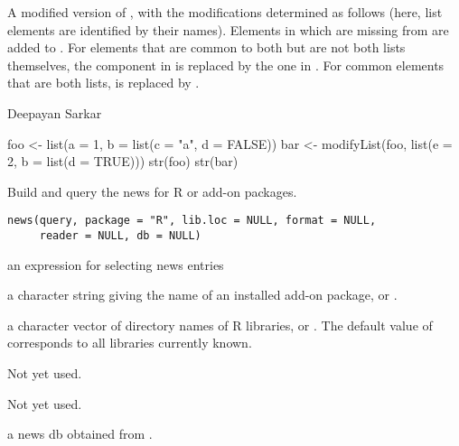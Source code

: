 %
\begin{Value}
A modified version of , with the modifications determined as
follows (here, list elements are identified by their names).  Elements
in  which are missing from  are added to .
For elements that are common to both but are not both lists
themselves, the component in  is replaced by the one in
.  For common elements that are both lists, 
is replaced by .
\end{Value}
%
\begin{Author}\relax
 Deepayan Sarkar 
\end{Author}
%
\begin{Examples}
\begin{ExampleCode}
foo <- list(a = 1, b = list(c = "a", d = FALSE))
bar <- modifyList(foo, list(e = 2, b = list(d = TRUE)))
str(foo)
str(bar)
\end{ExampleCode}
\end{Examples}
%
\begin{Description}\relax
Build and query the news for R or add-on packages.
\end{Description}
%
\begin{Usage}
\begin{verbatim}
news(query, package = "R", lib.loc = NULL, format = NULL,
     reader = NULL, db = NULL)
\end{verbatim}
\end{Usage}
%
\begin{Arguments}
\begin{ldescription}
\item[\code{query}] an expression for selecting news entries
\item[\code{package}] a character string giving the name of an installed
add-on package, or .
\item[\code{lib.loc}] a character vector of directory names of R libraries,
or .  The default value of  corresponds to all
libraries currently known.
\item[\code{format}] Not yet used.
\item[\code{reader}] Not yet used.
\item[\code{db}] a news db obtained from .
\end{ldescription}
\end{Arguments}
%
